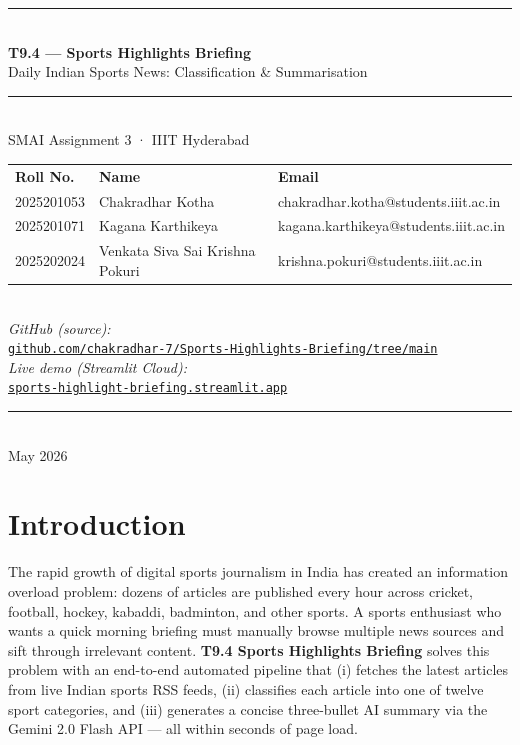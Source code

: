 \documentclass[11pt,a4paper]{article}
\begin{document}
\begin{titlepage}\centering
  \vspace*{0.8cm}
  {\color{iithblue}\rule{\linewidth}{2pt}}\\[0.3cm]
  {\LARGE\bfseries T9.4 — Sports Highlights Briefing}\\[0.2cm]
  {\large Daily Indian Sports News: Classification \& Summarisation}\\[0.2cm]
  {\color{iithblue}\rule{\linewidth}{2pt}}\\[0.8cm]
  {\large SMAI Assignment 3 · IIIT Hyderabad}\\[0.5cm]
  \begin{tabular}{lll}
    \textbf{Roll No.} & \textbf{Name} & \textbf{Email}\\[3pt]
    2025201053 & Chakradhar Kotha & chakradhar.kotha@students.iiit.ac.in\\
    2025201071 & Kagana Karthikeya & kagana.karthikeya@students.iiit.ac.in\\
    2025202024 & Venkata Siva Sai Krishna Pokuri & krishna.pokuri@students.iiit.ac.in\\
  \end{tabular}\\[0.8cm]
  \textit{GitHub (source):}\\[0.15cm]
  \href{https://github.com/chakradhar-7/Sports-Highlights-Briefing/tree/main}{\texttt{github.com/chakradhar-7/Sports-Highlights-Briefing/tree/main}}\\[0.5cm]
  \textit{Live demo (Streamlit Cloud):}\\[0.15cm]
  \href{https://sports-highlight-briefing.streamlit.app/}{\texttt{sports-highlight-briefing.streamlit.app}}\\[1cm]
  {\color{iithblue}\rule{\linewidth}{1pt}}\\[0.2cm]
  {\large May 2026}
\end{titlepage}

\tableofcontents\newpage

\section{Introduction}

The rapid growth of digital sports journalism in India has created an information overload problem: dozens of articles are published every hour across cricket, football, hockey, kabaddi, badminton, and other sports. A sports enthusiast who wants a quick morning briefing must manually browse multiple news sources and sift through irrelevant content. \textbf{T9.4 Sports Highlights Briefing} solves this problem with an end-to-end automated pipeline that (i) fetches the latest articles from live Indian sports RSS feeds, (ii) classifies each article into one of twelve sport categories, and (iii) generates a concise three-bullet AI summary via the Gemini 2.0 Flash API — all within seconds of page load.
\end{document}
